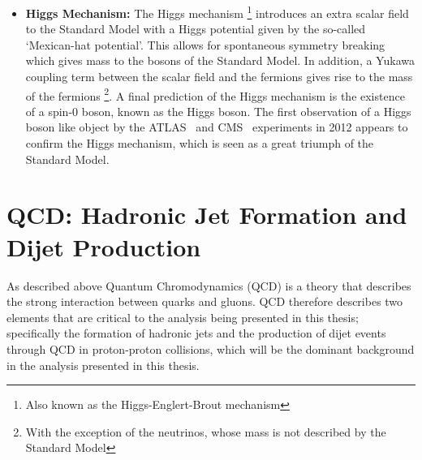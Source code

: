 \begin{itemize}[leftmargin=*]
  Quantum Chromodynamics (QCD) is a theory based on a $SU(3)$ gauge symmetry that describes the strong force.
  The strong force is mediated by the gluon and interacts with particles that have colour charge; which are quarks and gluons.
  The fact that the gluon has colour charge means that the gluon is self interacting.
  The $SU(3)$ symmetry results in 3 colour charges: known as red, green and blue.
  An anti-quark has colour charge anti-red, anti-blue or anti-green.
  A colour neutral object can be formed if all three colour charges are present (i.e. in a baryon containing three quarks)
  or if a colour and the corresponding anti-colour is present (i.e. in a meson that contains $q\bar{q}$).
  QCD is important in terms of understanding hadronic jet formation and the production of the
  largest background in a di-$b$-jet search, so further discussion of QCD is found in Section~\ref{sec:theo-qcd}.\\

\item\textbf{Higgs Mechanism:}
  The Higgs mechanism \footnote{Also known as the Higgs-Englert-Brout mechanism}
  introduces an extra scalar field to the Standard Model
  with a Higgs potential given by the so-called `Mexican-hat potential'.
  This allows for spontaneous symmetry breaking which gives mass to the bosons of the Standard Model.
  In addition, a Yukawa coupling term between the scalar field and the fermions gives rise to the mass of the fermions
  \footnote{With the exception of the neutrinos, whose mass is not described by the Standard Model}.
  A final prediction of the Higgs mechanism is the existence of a spin-0 boson, known as the Higgs boson.
  The first observation of a Higgs boson like object by the ATLAS~\cite{theo-higgs_atlas} and CMS~\cite{theo-higgs_cms} experiments
  in 2012 appears to confirm the Higgs mechanism, which is seen as a great triumph of the Standard Model.
\end{itemize}

\section{QCD: Hadronic Jet Formation and Dijet Production}
\label{sec:theo-qcd}

As described above Quantum Chromodynamics (QCD) is a theory that describes the strong interaction between
quarks and gluons.
QCD therefore describes two elements that are critical to the analysis being presented in this thesis;
specifically the formation of hadronic jets and the production of dijet events through QCD in proton-proton collisions,
which will be the dominant background in the analysis presented in this thesis.

